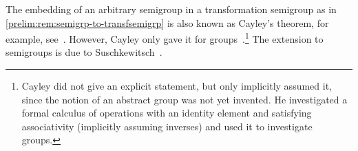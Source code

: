 The embedding of an arbitrary semigroup 
in a transformation semigroup as in \cref{prelim:rem:semigrp-to-transfsemigrp}
is also known as Cayley's theorem, 
for example, see~\cite[Thm.~2.4.3]{GanyushkinMazorchuk2008}.
However, Cayley only gave it for groups~\cite{Cayley54a}.\footnote{Cayley did not give an 
	explicit statement, but only implicitly assumed it, since the notion of an abstract group
	was not yet invented. He investigated a formal calculus of operations with an identity element and satisfying associativity (implicitly assuming inverses) and used it to investigate
	groups.}
The extension to semigroups is due to Suschkewitsch~\cite{Suschkewitsch1926}.


